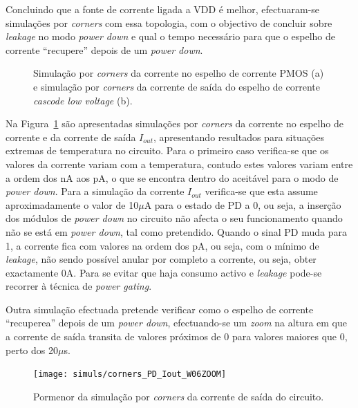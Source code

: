 \documentclass[11pt]{article}
\numberwithin{equation}{section}
\begin{document}
Concluindo que a fonte de corrente ligada a VDD é melhor, efectuaram-se simulações por \textit{corners} com essa topologia, com o objectivo de concluir sobre \textit{leakage} no modo \textit{power down} e qual o tempo necessário para que o espelho de corrente ``recupere'' depois de um \textit{power down}.

\begin{figure}[H]
	\centering
	\hspace{2mm}
	\vspace{-0.8em}
	\caption{Simulação por \textit{corners} da corrente no espelho de corrente PMOS (a) e simulação por \textit{corners} da corrente de saída do espelho de corrente \textit{cascode low voltage} (b).}
	\vspace{-0.8em}
	\label{fig:corners_pd}
\end{figure}

Na Figura~\ref{fig:corners_pd} são apresentadas simulações por \textit{corners} da corrente no espelho de corrente e da corrente de saída $I_{out}$, apresentando resultados para situações extremas de temperatura no circuito. Para o primeiro caso verifica-se que os valores da corrente variam com a temperatura, contudo estes valores variam entre a ordem dos nA aos pA, o que se encontra dentro do aceitável para o modo de \textit{power down}. Para a simulação da corrente $I_{out}$ verifica-se que esta assume aproximadamente o valor de 10$\mu$A para o estado de PD a 0, ou seja, a inserção dos módulos de \textit{power down} no circuito não afecta o seu funcionamento quando não se está em \textit{power down}, tal como pretendido. Quando o sinal PD muda para 1, a corrente fica com valores na ordem dos pA, ou seja, com o mínimo de \textit{leakage}, não sendo possível anular por completo a corrente, ou seja, obter exactamente 0A. Para se evitar que haja consumo activo e \textit{leakage} pode-se recorrer à técnica de \textit{power gating}.

Outra simulação efectuada pretende verificar como o espelho de corrente ``recuperea'' depois de um \textit{power down}, efectuando-se um \textit{zoom} na altura em que a corrente de saída transita de valores próximos de 0 para valores maiores que 0, perto dos 20$\mu$s.

\begin{figure}[H]
	\centering
	\texttt{[image: simuls/corners\_PD\_Iout\_W06ZOOM]}
	\vspace{-0.8em}
	\caption{Pormenor da simulação por \textit{corners} da corrente de saída do circuito.}
	\vspace{-0.8em}
\end{figure}
\end{document}
